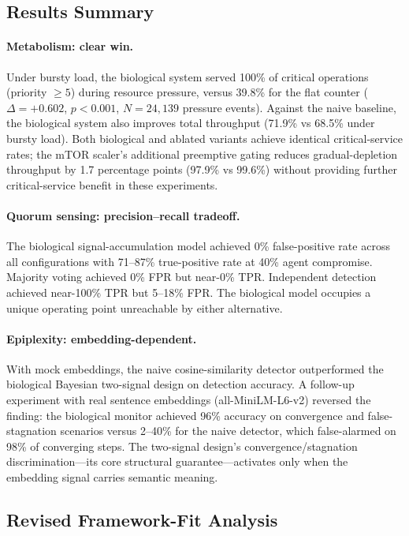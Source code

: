 \documentclass[11pt]{article}
\begin{document}
\subsection{Results Summary}

\paragraph{Metabolism: clear win.}
Under bursty load, the biological system served 100\% of critical
operations (priority $\geq 5$) during resource pressure, versus 39.8\%
for the flat counter ($\Delta = +0.602$, $p < 0.001$, $N = 24{,}139$
pressure events).  Against the naive baseline, the biological system
also improves total throughput (71.9\% vs 68.5\% under bursty load).
Both biological and ablated variants achieve identical critical-service
rates; the mTOR scaler's additional preemptive gating reduces gradual-depletion
throughput by 1.7 percentage points (97.9\% vs 99.6\%) without
providing further critical-service benefit in these experiments.

\paragraph{Quorum sensing: precision--recall tradeoff.}
The biological signal-accumulation model achieved 0\% false-positive
rate across all configurations with 71--87\% true-positive rate at
40\% agent compromise.  Majority voting achieved 0\% FPR but near-0\%
TPR.  Independent detection achieved near-100\% TPR but 5--18\% FPR.
The biological model occupies a unique operating point unreachable by
either alternative.

\paragraph{Epiplexity: embedding-dependent.}
With mock embeddings, the naive cosine-similarity detector outperformed
the biological Bayesian two-signal design on detection accuracy.
A follow-up experiment with real sentence embeddings (all-MiniLM-L6-v2)
reversed the finding: the biological monitor achieved 96\% accuracy on
convergence and false-stagnation scenarios versus 2--40\% for the naive
detector, which false-alarmed on 98\% of converging steps.  The
two-signal design's convergence/stagnation discrimination---its core
structural guarantee---activates only when the embedding signal carries
semantic meaning.

\subsection{Revised Framework-Fit Analysis}
\end{document}
